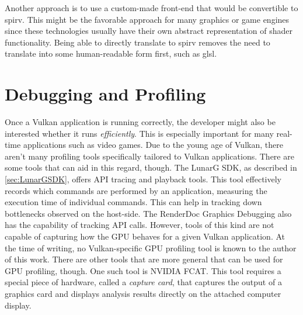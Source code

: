     Another approach is to use a custom-made front-end that would be convertible to \gls{spirv}. This might be the favorable approach for many graphics or game engines since these technologies usually have their own abstract representation of shader functionality. Being able to directly translate to \gls{spirv} removes the need to translate into some human-readable form first, such as \gls{glsl}.


  \section{Debugging and Profiling}
  \label{sec:DebuggingAndProfiling}

    Once a Vulkan application is running correctly, the developer might also be interested whether it runs \textit{efficiently}. This is especially important for many real-time applications such as video games. Due to the young age of Vulkan, there aren't many profiling tools specifically tailored to Vulkan applications. There are some tools that can aid in this regard, though. The LunarG SDK, as described in \ref{sec:LunarGSDK}, offers API tracing and playback tools. This tool effectively records which commands are performed by an application, measuring the execution time of individual commands. This can help in tracking down bottlenecks observed on the host-side. The RenderDoc Graphics Debugging\cite{renderdoc} also has the capability of tracking API calls. However, tools of this kind are not capable of capturing how the GPU behaves for a given Vulkan application. At the time of writing, no Vulkan-specific GPU profiling tool is known to the author of this work. There are other tools that are more general that can be used for GPU profiling, though. One such tool is NVIDIA FCAT\cite{nvidiafcat}. This tool requires a special piece of hardware, called a \textit{capture card}, that captures the output of a graphics card and displays analysis results directly on the attached computer display.

